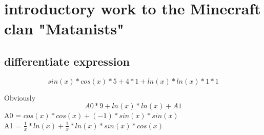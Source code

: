 \documentclass[12pt]{article}
\begin{document}
\section{introductory work to the Minecraft clan "Matanists"}
\subsection{differentiate expression}
$$sin(x)*cos(x)*5 + 4*1 + ln(x)*ln(x)*1*1$$ 
Obviously \\ 
$$A0*9 + ln(x)*ln(x) + A1$$ 
A0 = $cos(x)*cos(x) + (-1)*sin(x)*sin(x)$ \\ 
A1 = $\frac{1}{x}*ln(x) + \frac{1}{x}*ln(x)*sin(x)*cos(x)$ \\ 
\end{document}
